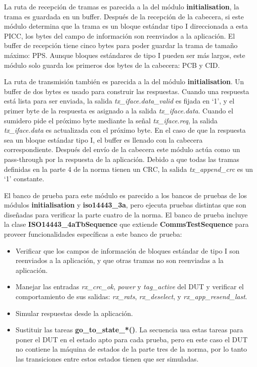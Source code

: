 \documentclass[a4paper, twoside, 11pt]{report}
\begin{document}
La ruta de recepción de tramas es parecida a la del módulo \textbf{initialisation}, la trama es guardada en un buffer. Después de la recepción de la cabecera, si este módulo determina que la trama es un bloque estándar tipo I direccionada a esta PICC, los bytes del campo de información son reenviados a la aplicación. El buffer de recepción tiene cinco bytes para poder guardar la trama de tamaño máximo: PPS. Aunque bloques estándares de tipo I pueden ser más largos, este módulo solo guarda los primeros dos bytes de la cabecera: PCB y CID.

La ruta de transmisión también es parecida a la del módulo \textbf{initialisation}. Un buffer de dos bytes es usado para construir las respuestas. Cuando una respuesta está lista para ser enviada, la salida \textit{tx\_iface.data\_valid} es fijada en ‘1’, y el primer byte de la respuesta es asignado a la salida \textit{tx\_iface.data}. Cuando el sumidero pide el próximo byte mediante la señal \textit{tx\_iface.req}, la salida \textit{tx\_iface.data} es actualizada con el próximo byte. En el caso de que la respuesta sea un bloque estándar tipo I, el buffer es llenado con la cabecera correspondiente. Después del envío de la cabecera este módulo actúa como un pass-through por la respuesta de la aplicación. Debido a que todas las tramas definidas en la parte 4 de la norma tienen un CRC, la salida \textit{tx\_append\_crc} es un ‘1’ constante.

El banco de prueba para este módulo es parecido a los bancos de pruebas de los módulos \textbf{initialisation} y \textbf{iso14443\_3a}, pero ejecuta pruebas distintas que son diseñadas para verificar la parte cuatro de la norma. El banco de prueba incluye la clase \textbf{ISO14443\_4a\-TbSequence} que extiende \textbf{CommsTestSequence} para proveer funcionalidades específicas a este banco de prueba:

\begin{itemize}
  \item Verificar que los campos de información de bloques estándar de tipo I son reenviados a la aplicación, y que otras tramas no son reenviadas a la aplicación.
  \item Manejar las entradas \textit{rx\_crc\_ok}, \textit{power} y \textit{tag\_active} del DUT y verificar el comportamiento de sus salidas: \textit{rx\_rats}, \textit{rx\_deselect}, y \textit{rx\_app\_resend\_last}.
  \item Simular respuestas desde la aplicación.
  \item Sustituir las tareas \textbf{go\_to\_state\_*()}. La secuencia usa estas tareas para poner el DUT en el estado apto para cada prueba, pero en este caso el DUT no contiene la máquina de estados de la parte tres de la norma, por lo tanto las transiciones entre estos estados tienen que ser simuladas.
\end{itemize}
\end{document}
